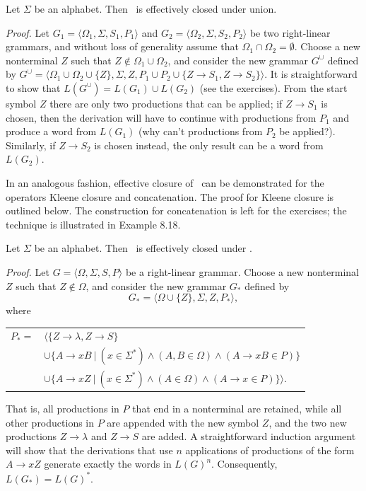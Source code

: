 \begin{thm}\label{thm-8.4}
Let $\Sigma$ be an alphabet. Then \GSIG\ is effectively closed under union.

\emph{Proof.} Let $G_1=\langle\Omega_1,\Sigma,S_1,P_1\rangle$ and $G_2=\langle
\Omega_2,\Sigma,S_2,P_2\rangle$ be two right-linear grammars, and without loss
of generality assume that $\Omega_1\cap\Omega_2=\emptyset$. Choose a new
nonterminal $Z$ such that $Z \not \in \Omega_1\cup\Omega_2$, and consider the new
grammar $G^{\cup}$ defined by $G^{\cup}=\langle\Omega_1\cup\Omega_2\cup\{Z\},
\Sigma,Z,P_1\cup P_2\cup\{Z\rightarrow S_1,Z\rightarrow S_2\}\rangle$. It is
straightforward to show that $L(G^{\cup})=L(G_1)\cup L(G_2)$ (see the exercises).
From the start symbol $Z$ there are only two productions that can be applied; if
$Z\rightarrow S_1$ is chosen, then the derivation will have to continue with
productions from $P_1$ and produce a word from $L(G_1)$ (why can't productions
from $P_2$ be applied?). Similarly, if $Z\rightarrow S_2$ is chosen instead, the
only result can be a word from $L(G_2)$.
\end{thm}

In an analogous fashion, effective closure of \GSIG\ can be demonstrated for the
operators Kleene closure and concatenation. The proof for Kleene closure is
outlined below. The construction for concatenation is left for the exercises;
the technique is illustrated in Example 8.18.

\begin{thm}\label{thm-8.5}
Let $\Sigma$ be an alphabet. Then \GSIG\ is effectively closed under
.

\emph{Proof.} Let $G=\langle\Omega,\Sigma,S,P\rangle$ be a right-linear grammar.
Choose a new nonterminal $Z$ such that $Z \not \in \Omega$, and consider the new
grammar $G_*$ defined by
\[ G_* = \langle\Omega\cup\{Z\},\Sigma,Z,P_*\rangle, \]
where
\begin{center}\begin{tabular}{r@{ }l}
$P_* =$ & $\langle\{Z\rightarrow\lambda,Z\rightarrow S\}$ \\
& $\cup\{A\rightarrow xB\ |\ (x\in\Sigma^*)\wedge(A,B\in\Omega)\wedge(A\rightarrow
	xB\in P)\}$ \\
& $\cup\{A\rightarrow xZ\ |\ (x\in\Sigma^*)\wedge(A\in\Omega)\wedge(A\rightarrow x
	\in P)\}\rangle$.
\end{tabular}\end{center}
That is, all productions in $P$ that end in a nonterminal are retained, while
all other productions in $P$ are appended with the new symbol $Z$, and the two
new productions $Z\rightarrow\lambda$ and $Z\rightarrow S$ are added. A
straightforward induction argument will show that the derivations that use $n$
applications of productions of the form $A\rightarrow xZ$ generate exactly the
words in $L(G)^n$. Consequently, $L(G_*) = L(G)^*$.
\end{thm}

